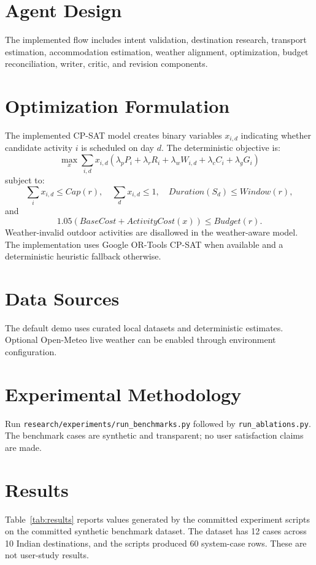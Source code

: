 \documentclass[11pt]{article}
\begin{document}
\section{Agent Design}
The implemented flow includes intent validation, destination research, transport estimation, accommodation estimation,
weather alignment, optimization, budget reconciliation, writer, critic, and revision components.

\section{Optimization Formulation}
The implemented CP-SAT model creates binary variables $x_{i,d}$ indicating whether candidate activity $i$ is scheduled
on day $d$. The deterministic objective is:
\[
\max_x \sum_{i,d} x_{i,d}(\lambda_p P_i + \lambda_r R_i + \lambda_w W_{i,d} + \lambda_c C_i + \lambda_g G_i)
\]
subject to:
\[
\sum_i x_{i,d} \leq Cap(r),\quad \sum_d x_{i,d} \leq 1,\quad Duration(S_d) \leq Window(r),
\]
and
\[
1.05(BaseCost + ActivityCost(x)) \leq Budget(r).
\]
Weather-invalid outdoor activities are disallowed in the weather-aware model. The implementation uses Google OR-Tools
CP-SAT when available and a deterministic heuristic fallback otherwise.

\section{Data Sources}
The default demo uses curated local datasets and deterministic estimates. Optional Open-Meteo live weather can be
enabled through environment configuration.

\section{Experimental Methodology}
Run \texttt{research/experiments/run\_benchmarks.py} followed by \texttt{run\_ablations.py}. The benchmark cases are
synthetic and transparent; no user satisfaction claims are made.

\section{Results}
Table~\ref{tab:results} reports values generated by the committed experiment scripts on the committed synthetic
benchmark dataset. The dataset has 12 cases across 10 Indian destinations, and the scripts produced 60 system-case rows.
These are not user-study results.
\end{document}
